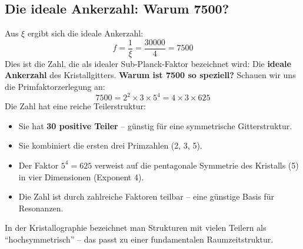 	\subsection{Die ideale Ankerzahl: Warum 7500?}
	Aus \(\xi\) ergibt sich die ideale Ankerzahl:
	\begin{equation}
		\boxed{f = \frac{1}{\xi} = \frac{30000}{4} = 7500}
	\end{equation}
	Dies ist die Zahl, die als idealer Sub-Planck-Faktor bezeichnet wird: Die \textbf{ideale Ankerzahl} des Kristallgitters.
	\textbf{Warum ist 7500 so speziell?} Schauen wir uns die Primfaktorzerlegung an:
	\begin{equation}
		7500 = 2^2 \times 3 \times 5^4 = 4 \times 3 \times 625
	\end{equation}
	Die Zahl hat eine reiche Teilerstruktur:
	\begin{itemize}
		\item Sie hat \textbf{30 positive Teiler} -- günstig für eine symmetrische Gitterstruktur.
		\item Sie kombiniert die ersten drei Primzahlen (2, 3, 5).
		\item Der Faktor \(5^4 = 625\) verweist auf die pentagonale Symmetrie des Kristalls (5) in vier Dimensionen (Exponent 4).
		\item Die Zahl ist durch zahlreiche Faktoren teilbar -- eine günstige Basis für Resonanzen.
	\end{itemize}
	In der Kristallographie bezeichnet man Strukturen mit vielen Teilern als \enquote{hochsymmetrisch} -- das passt zu einer fundamentalen Raumzeitstruktur.
